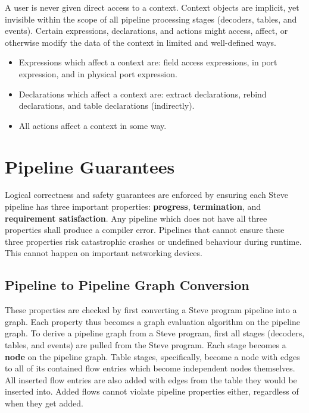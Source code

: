 A user is never given direct access to a context. Context objects are implicit, yet invisible within the scope of all pipeline processing stages (decoders, tables, and events). Certain expressions, declarations, and actions might access, affect, or otherwise modify the data of the context in limited and well-defined ways. 
\begin{itemize}
\item Expressions which affect a context are: field access expressions, in port expression, and in physical port expression.

\item Declarations which affect a context are: extract declarations, rebind declarations, and table declarations (indirectly).

\item All actions affect a context in some way.
\end{itemize}

\section{Pipeline Guarantees} \label{pipeline_checking_guide}

Logical correctness and safety guarantees are enforced by ensuring each Steve pipeline has three important properties: \textbf{progress}, \textbf{termination}, and \textbf{requirement satisfaction}. Any pipeline which does not have all three properties shall produce a compiler error. Pipelines that cannot ensure these three properties risk catastrophic crashes or undefined behaviour during runtime. This cannot happen on important networking devices.

\subsection{Pipeline to Pipeline Graph Conversion} \label{pipeline_graph}

These properties are checked by first converting a Steve program pipeline into a graph. Each property thus becomes a graph evaluation algorithm on the pipeline graph. To derive a pipeline graph from a Steve program, first all stages (decoders, tables, and events) are pulled from the Steve program. Each stage becomes a \textbf{node} on the pipeline graph. Table stages, specifically, become a node with edges to all of its contained flow entries which become independent nodes themselves. All inserted flow entries are also added with edges from the table they would be inserted into. Added flows cannot violate pipeline properties either, regardless of when they get added.

